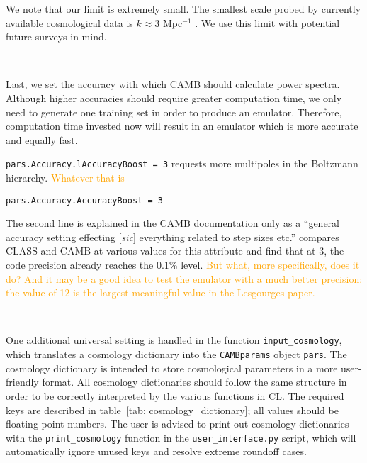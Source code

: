 We note that our limit is extremely small. The smallest scale probed by
currently available cosmological data is $k \approx 3$ Mpc$^{-1}$
. We use this limit with potential future surveys in mind.

\

Last, we set the accuracy with which CAMB should calculate power spectra.
Although higher accuracies should require greater computation time, we only
need to generate one training set in order to produce an emulator. Therefore,
computation time invested now will result in an emulator which is more
accurate and equally fast.

\verb|pars.Accuracy.lAccuracyBoost = 3| \quad requests more multipoles in the Boltzmann hierarchy. \textcolor{orange}{Whatever that is}

\verb|pars.Accuracy.AccuracyBoost = 3| 

The second line is explained in the CAMB documentation only as a ``general 
accuracy setting effecting [\textit{sic}] everything related to step sizes 
etc.'' \citet{Lesgourges} compares CLASS and CAMB at various values for this
attribute and find that at 3, the code precision already reaches the 0.1\% 
level. \textcolor{orange}{But what, more specifically, does it do? And it may
be a good idea to test the emulator with a much better precision: the value of
12 is the largest meaningful value in the Lesgourges paper.}

\

One additional universal setting is handled in the function
\verb|input_cosmology|, which translates a cosmology dictionary into 
the \verb|CAMBparams| object \verb|pars|. The cosmology dictionary is
intended to store cosmological parameters in a more user-friendly format.
All cosmology dictionaries should follow the same structure in order to be 
correctly interpreted by the various functions in CL. The required keys are described in table~\ref{tab: cosmology_dictionary}; all
values should be floating point numbers. The user is advised to print out
cosmology dictionaries with the \verb|print_cosmology| function in the
\verb|user_interface.py| script, which will automatically ignore unused keys
and resolve extreme roundoff cases.



